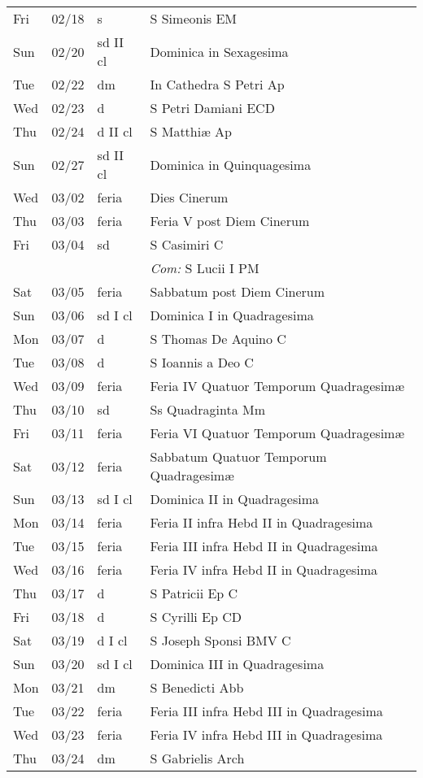 \documentclass[10pt]{article}
\begin{document}
\begin{longtable}{ l l l l }
Fri & 02/18 & s & S Simeonis EM\\
Sun & 02/20 & sd II cl & Dominica in Sexagesima\\
Tue & 02/22 & dm & In Cathedra S Petri Ap\\
Wed & 02/23 & d & S Petri Damiani ECD\\
Thu & 02/24 & d II cl & S Matthiæ Ap\\
Sun & 02/27 & sd II cl & Dominica in Quinquagesima\\
Wed & 03/02 & feria & Dies Cinerum\\
Thu & 03/03 & feria & Feria V post Diem Cinerum\\
Fri & 03/04 & sd & S Casimiri C\\
 & & & \textit{Com:} S Lucii I PM\\
Sat & 03/05 & feria & Sabbatum post Diem Cinerum\\
Sun & 03/06 & sd I cl & Dominica I in Quadragesima\\
Mon & 03/07 & d & S Thomas De Aquino C\\
Tue & 03/08 & d & S Ioannis a Deo C\\
Wed & 03/09 & feria & Feria IV Quatuor Temporum Quadragesimæ\\
Thu & 03/10 & sd & Ss Quadraginta Mm\\
Fri & 03/11 & feria & Feria VI Quatuor Temporum Quadragesimæ\\
Sat & 03/12 & feria & Sabbatum Quatuor Temporum Quadragesimæ\\
Sun & 03/13 & sd I cl & Dominica II in Quadragesima\\
Mon & 03/14 & feria & Feria II infra Hebd II in Quadragesima\\
Tue & 03/15 & feria & Feria III infra Hebd II in Quadragesima\\
Wed & 03/16 & feria & Feria IV infra Hebd II in Quadragesima\\
Thu & 03/17 & d & S Patricii Ep C\\
Fri & 03/18 & d & S Cyrilli Ep CD\\
Sat & 03/19 & d I cl & S Joseph Sponsi BMV C\\
Sun & 03/20 & sd I cl & Dominica III in Quadragesima\\
Mon & 03/21 & dm & S Benedicti Abb\\
Tue & 03/22 & feria & Feria III infra Hebd III in Quadragesima\\
Wed & 03/23 & feria & Feria IV infra Hebd III in Quadragesima\\
Thu & 03/24 & dm & S Gabrielis Arch\\

\end{longtable}
\end{document}
